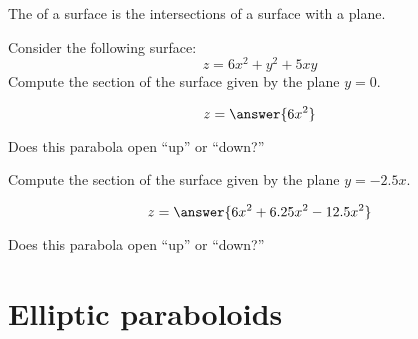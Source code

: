 \documentclass{ximera}
\begin{document}
\begin{definition}
  The  of a surface is the intersections of
  a surface with a plane.
\end{definition}

\begin{question}
  Consider the following surface:
  \[
  z = 6x^2 + y^2 + 5 xy
  \]
  Compute the section of the surface given by the plane $y=0$.
  \begin{prompt}
    \[
    z = \answer{6x^2}
    \]
  \end{prompt}
  \begin{question}
    Does this parabola open ``up'' or ``down?''
    \begin{prompt}
    \begin{multipleChoice}
    \end{multipleChoice}
    \end{prompt}
    \begin{question}
      Compute the section of the surface given by the plane $y=-2.5 x$.
      \begin{prompt}
        \[
        z = \answer{6x^2 + 6.25 x^2 - 12.5x^2}
        \]
      \end{prompt}
      \begin{question}
        Does this parabola open ``up'' or ``down?''
        \begin{prompt}
          \begin{multipleChoice}
          \end{multipleChoice}
        \end{prompt}
      \end{question}
    \end{question}
  \end{question}
\end{question}

  





\section{Elliptic paraboloids}
\end{document}
